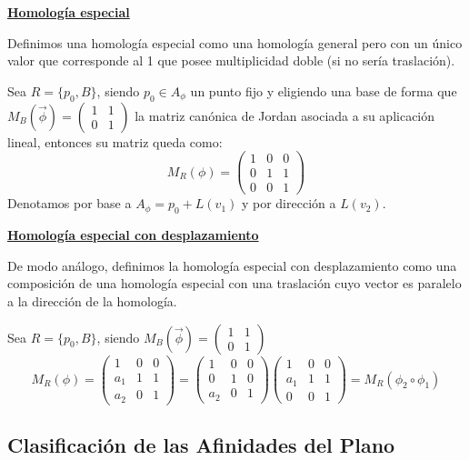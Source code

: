 \documentclass[10pt,a4paper,openright]{book}
\theoremstyle{break}
\begin{document}
\underline{\textbf{Homología especial}}

Definimos una homología especial como una homología general pero con un único valor que corresponde al 1 que posee multiplicidad doble (si no sería traslación).

Sea $R = \{p_0 , B\}$, siendo $p_0 \in A_\phi$ un punto fijo y eligiendo una base de forma que $M_B (\vec{\phi}) = \begin{pmatrix} 1 & 1   \\ 0 & 1  \end{pmatrix} $ la matriz canónica de Jordan asociada a su aplicación lineal, entonces su matriz queda como:
$$M_R (\phi) = \left(\begin{array}{c|cc}
1  & 0 & 0 \\
\hline
0 & 1 &  1 \\
0 & 0 &  1
\end{array}
\right)$$
Denotamos por base a $A_\phi = p_0 + L(v_1)$ y por dirección a $L(v_2)$.

\underline{\textbf{Homología especial con desplazamiento}}

De modo análogo, definimos la homología especial con desplazamiento como una composición de una homología especial con una traslación cuyo vector es paralelo a la dirección de la homología.

Sea $R = \{p_0 , B\}$, siendo $M_B (\vec{\phi}) = \begin{pmatrix} 1 & 1   \\ 0 & 1  \end{pmatrix} $
$$M_R (\phi) = \left(\begin{array}{c|cc}
1  & 0 & 0 \\
\hline
a_1 & 1 &  1 \\
a_2 & 0 &  1
\end{array}
\right) = \left(\begin{array}{c|cc}
1  & 0 & 0 \\
\hline
0 & 1 &  0 \\
a_2 & 0 &  1
\end{array}
\right)\left(\begin{array}{c|cc}
1  & 0 & 0 \\
\hline
a_1 & 1 &  1 \\
0 & 0 &  1
\end{array}
\right) = M_R (\phi_2 \circ \phi_1)$$

\newpage
\subsection{Clasificación de las Afinidades del Plano}
\end{document}
